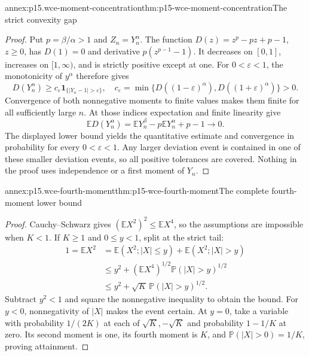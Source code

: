 \begin{annexitem}{annex:p15.wce-moment-concentration}{thm:p15-wce-moment-concentration}{The strict convexity gap}
\begin{proof}
Put \(p=\beta/\alpha>1\) and \(Z_n=Y_n^\alpha\).
The function \(D(z)=z^p-pz+p-1\), \(z\geq0\), has
\(D(1)=0\) and derivative \(p(z^{p-1}-1)\).
It decreases on \([0,1]\), increases on \([1,\infty)\),
and is strictly positive except at one.
For \(0<\varepsilon<1\), the monotonicity of \(y^\alpha\)
therefore gives
\[
 D(Y_n^\alpha)\geq c_\varepsilon
                    \mathbf1_{\{|Y_n-1|>\varepsilon\}},
 \quad
 c_\varepsilon=
 \min\{D((1-\varepsilon)^\alpha),D((1+\varepsilon)^\alpha)\}>0.
 \]
Convergence of both nonnegative moments to finite values makes
them finite for all sufficiently large \(n\).
At those indices expectation and finite linearity give
\[
 \mathbb ED(Y_n^\alpha)
   =\mathbb EY_n^\beta-p\mathbb EY_n^\alpha+p-1\to0.
 \]
The displayed lower bound yields the quantitative estimate and
convergence in probability for every \(0<\varepsilon<1\).
Any larger deviation event is contained in one of these smaller
deviation events, so all positive tolerances are covered.
Nothing in the proof uses independence or a first moment of \(Y_n\).
\end{proof}
\end{annexitem}

\begin{annexitem}{annex:p15.wce-fourth-moment}{thm:p15-wce-fourth-moment}{The complete fourth-moment lower bound}
\begin{proof}
Cauchy--Schwarz gives
\((\mathbb EX^2)^2\leq\mathbb EX^4\), so the assumptions
are impossible when \(K<1\).
If \(K\geq1\) and \(0\leq y<1\), split at the strict tail:
\[
 \begin{split}
 1=\mathbb EX^2
 &=\mathbb E(X^2;|X|\leq y)+\mathbb E(X^2;|X|>y)\\
 &\leq y^2+
         (\mathbb EX^4)^{1/2}\mathbb P(|X|>y)^{1/2}\\
 &\leq y^2+\sqrt K\,\mathbb P(|X|>y)^{1/2}.
 \end{split}
 \]
Subtract \(y^2<1\) and square the nonnegative inequality
to obtain the bound. For \(y<0\), nonnegativity of \(|X|\)
makes the event certain.
At \(y=0\), take a variable with probability \(1/(2K)\)
at each of \(\sqrt K,-\sqrt K\) and probability \(1-1/K\)
at zero. Its second moment is one, its fourth moment is \(K\),
and \(\mathbb P(|X|>0)=1/K\), proving attainment.
\end{proof}
\end{annexitem}


